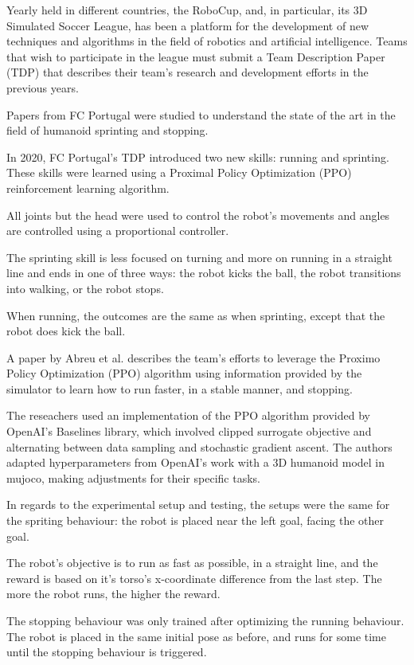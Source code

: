 \documentclass[conference]{IEEEtran}
\begin{document}
Yearly held in different countries, the RoboCup, and, in particular, its 3D Simulated Soccer League, has been a platform for the development of new techniques and algorithms in the field of robotics and artificial intelligence.
Teams that wish to participate in the league must submit a Team Description Paper (TDP) that describes their team's research and development efforts in the previous years.

Papers from FC Portugal were studied to understand the state of the art in the field of humanoid sprinting and stopping.

In 2020, FC Portugal's TDP \cite{lau2020fc} introduced two new skills: running and sprinting. These skills were learned using
a Proximal Policy Optimization (PPO) reinforcement learning algorithm.

All joints but the head were used to control the robot's movements and angles are controlled using a proportional controller.

The sprinting skill is less focused on turning and more on running in a straight line and ends in one of three ways:
the robot kicks the ball, the robot transitions into walking, or the robot stops.

When running, the outcomes are the same as when sprinting, except that the robot does kick the ball.

A paper by Abreu et al. \cite{10.1007/978-3-030-35699-6_1} describes the team's efforts to leverage the Proximo Policy Optimization (PPO)
algorithm using information provided by the simulator to learn how to run faster, in a stable manner, and stopping.

The reseachers used an implementation of the PPO algorithm provided by OpenAI's Baselines library, which involved
clipped surrogate objective and alternating between data sampling and stochastic gradient ascent. The authors adapted hyperparameters from OpenAI's work with a
3D humanoid model in mujoco, making adjustments for their specific tasks.

In regards to the experimental setup and testing, the setups were the same for the spriting behaviour: the robot is placed near the left goal, facing the other
goal.

The robot's objective is to run as fast as possible, in a straight line, and the reward is based on it's torso's x-coordinate difference
from the last step. The more the robot runs, the higher the reward.

The stopping behaviour was only trained after optimizing the running behaviour.
The robot is placed in the same initial pose as before, and runs for some time until the stopping behaviour is triggered.
\end{document}
